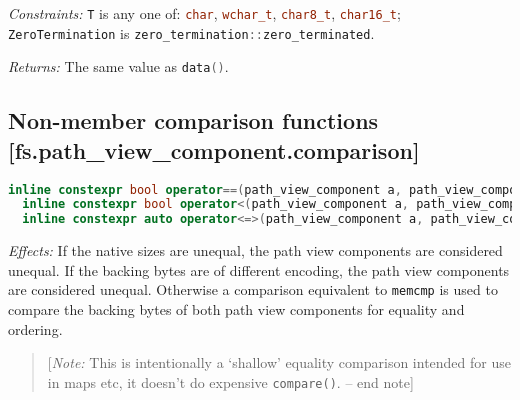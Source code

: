\documentclass[11pt]{article}
\newcommand{\code}[2][cpp]{\lstinline[language=#1,basicstyle=\small\ttfamily]{#2}}
\newcommand{\desc}[1]{\textit{#1}}
\newcommand{\constraints}{\desc{Constraints: }}
\newcommand{\effects}{\desc{Effects: }}
\newcommand{\returns}{\desc{Returns: }}
\newcommand{\note}[1]{\begin{quote}[\textit{Note:} #1 -- end note]\end{quote}}
\begin{document}
\constraints \code{T} is any one of: \code{char}, \code{wchar_t}, \code{char8_t}, \code{char16_t}; \code{ZeroTermination} is \code{zero_termination::zero_terminated}.

\returns The same value as \code{data()}.\\

\subsection*{Non-member comparison functions [fs.path\_view\_component.comparison]}

\begin{lstlisting}[language=cpp]
  inline constexpr bool operator==(path_view_component a, path_view_component b) noexcept;
  inline constexpr bool operator<(path_view_component a, path_view_component b) noexcept;
  inline constexpr auto operator<=>(path_view_component a, path_view_component b) = default;
\end{lstlisting}

\effects If the native sizes are unequal, the path view components are considered unequal. If the backing bytes are of different encoding, the path view components are considered unequal. Otherwise a comparison equivalent to \code{memcmp} is used to compare the backing bytes of both path view components for equality and ordering.
\color{black}

\note{This is intentionally a `shallow' equality comparison intended for use in maps etc, it doesn't do expensive \code{compare()}.}

\color{darkgreen}
\end{document}
